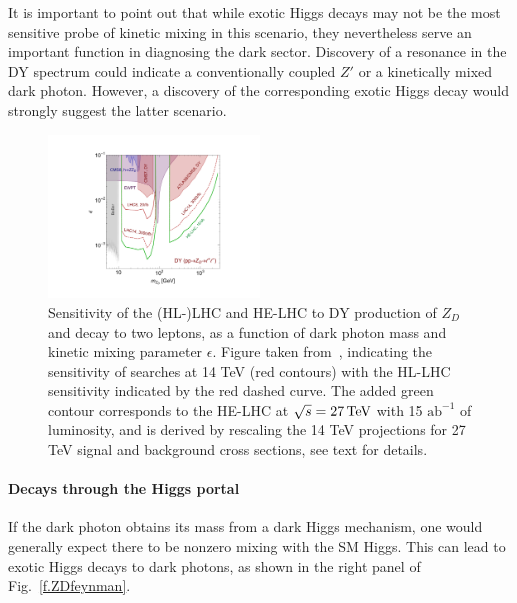 It is important to point out that while exotic Higgs decays may not be the most sensitive probe of kinetic mixing in this scenario, they nevertheless serve an important function in diagnosing the dark sector. Discovery of a resonance in the DY spectrum could indicate a conventionally coupled $Z'$ or a kinetically mixed dark photon. However, a  discovery of the  corresponding exotic Higgs decay would strongly suggest the latter scenario. 


\begin{figure}
\begin{center}
\includegraphics[width=0.5\textwidth]{section9/plots/new_DYplot_epsilon}
\end{center}
\caption{
Sensitivity of the (HL-)LHC and HE-LHC to DY production of $Z_D$ and decay to two leptons,  as a function of dark photon mass and kinetic mixing parameter $\epsilon$. Figure taken from~\cite{Curtin:2014cca}, indicating the sensitivity of searches at 14 TeV (red contours) with the HL-LHC sensitivity indicated by the red dashed curve. The added green contour corresponds to the HE-LHC at $\sqrt{s} = 27 \,\text{Te\hspace{-.08em}V}$ with 15 $\mathrm{ab}^{-1}$ of luminosity, and is derived by rescaling the 14 TeV projections for 27 TeV signal and background cross sections, see text for details. 
}
\label{f.darkphotonDY}
\end{figure}


\bigskip

\paragraph{Decays through the Higgs portal}

If the dark photon obtains its mass from a dark Higgs mechanism, one would generally expect there to be nonzero mixing with the SM Higgs. This can lead to exotic Higgs decays to dark photons, as shown in the right panel of Fig.~\ref{f.ZDfeynman}. 



